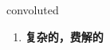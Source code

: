 
\begin{frame}
{\huge convoluted}
\begin{center}
\begin{enumerate}\Large
  \item \textbf{复杂的，费解的}
\end{enumerate}
\end{center}
\end{frame}
